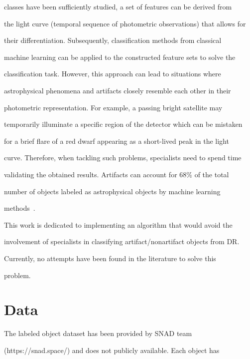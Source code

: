 classes have been sufficiently studied, a set of features can be derived from 

the light curve (temporal sequence of photometric observations) that allows for 

their differentiation. Subsequently, classification methods from classical 

machine learning can be applied to the constructed feature sets to solve the 

classification task. However, this approach can lead to situations where 

astrophysical phenomena and artifacts closely resemble each other in their 

photometric representation. For example, a passing bright satellite may 

temporarily illuminate a specific region of the detector which can be mistaken 

for a brief flare of a red dwarf appearing as a short-lived peak in the light 

curve. Therefore, when tackling such problems, specialists need to spend time 

validating the obtained results. Artifacts can account for $68\%$ of the total 

number of objects labeled as astrophysical objects by machine learning 

methods~\cite{2021MNRAS.502.5147M}.



This work is dedicated to implementing an algorithm that would avoid the 

involvement of specialists in classifying artifact/nonartifact objects from DR.


Currently, no attempts have been found in the literature to solve this 

problem.



\section{Data}



\noindent

The labeled object dataset has been provided by SNAD team 

({\sf https://snad.space/}) and does not publicly available. Each object has 

